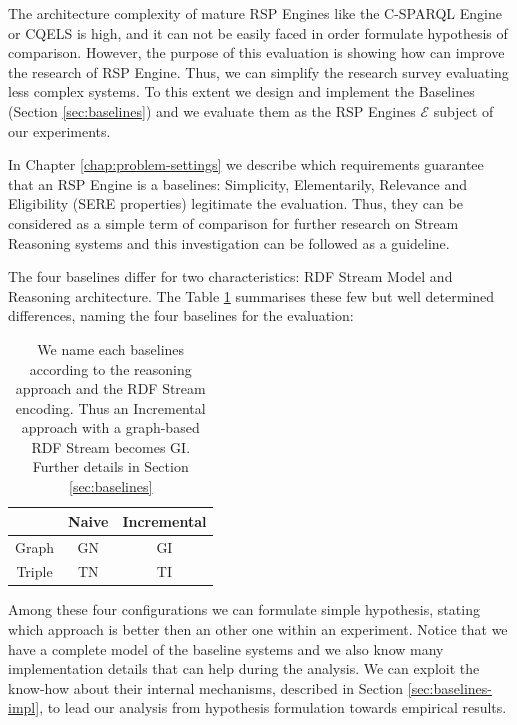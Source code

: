 The architecture complexity of mature RSP Engines like the C-SPARQL Engine or CQELS is high, and it can not be easily faced in order formulate hypothesis of comparison. However, the purpose of this evaluation is showing how \name can improve the research of RSP Engine. Thus, we can simplify the research survey evaluating less complex systems. To this extent we design and implement the Baselines (Section \ref{sec:baselines}) and we evaluate them as the RSP Engines $\mathcal{E}$ subject of our experiments. 

In Chapter \ref{chap:problem-settings} we describe which requirements guarantee that an RSP Engine is a baselines: Simplicity, Elementarily, Relevance and Eligibility (SERE properties) legitimate the evaluation. Thus, they can be considered as a simple term of comparison for further research on Stream Reasoning systems and this investigation can be followed as a guideline.
 
The four baselines differ for two characteristics: RDF Stream Model and Reasoning architecture. The Table \ref{tab:baselines-names} summarises these few but well determined differences, naming the four baselines for the evaluation:
\begin{table}[htb]
\centering
\normalsize
\begin{tabular}{c|cc} %
	\hline
         & Naive & Incremental\\
	\hline
	Graph        &  GN      & GI\\
	Triple   &  TN   & TI\\
	\hline %
\end{tabular}
\caption[Baselines Naming Convention]{We name each baselines according to  the reasoning approach and the RDF Stream encoding. Thus an Incremental approach with a graph-based RDF Stream becomes GI. Further details in Section \ref{sec:baselines}}
\label{tab:baselines-names}
\end{table}

\noindent Among these four configurations we can formulate simple hypothesis, stating which approach is better then an other one within an experiment. Notice that we have a complete model of the baseline systems and we also know many implementation details that can help during the analysis. We can exploit the know-how about their internal mechanisms, described in Section \ref{sec:baselines-impl}, to lead our analysis from hypothesis formulation towards empirical results. 

